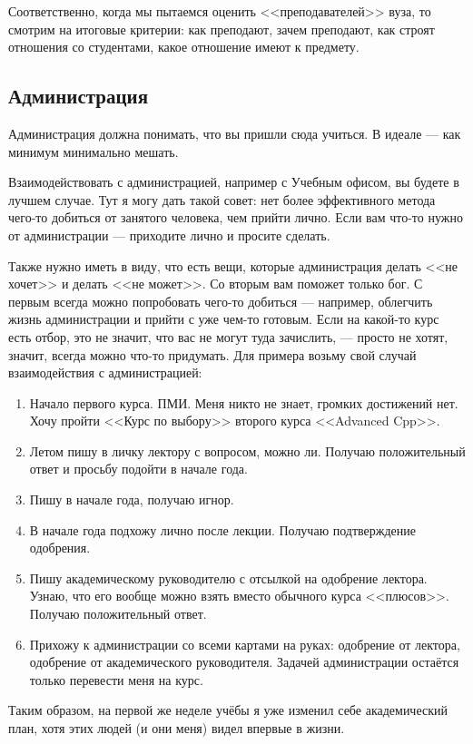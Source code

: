 \documentclass[12pt, a4paper]{article}
\begin{document}
Соответственно, когда мы пытаемся оценить <<преподавателей>> вуза, то смотрим на итоговые критерии: как преподают, зачем преподают, как строят отношения со студентами, какое отношение имеют к предмету.

\subsection{Администрация}

Администрация должна понимать, что вы пришли сюда учиться. В идеале --- как минимум минимально мешать. 

Взаимодействовать с администрацией, например с Учебным офисом, вы будете в лучшем случае. Тут я могу дать такой совет: нет более эффективного метода чего-то добиться от занятого человека, чем прийти лично. Если вам что-то нужно от администрации --- приходите лично и просите сделать.

Также нужно иметь в виду, что есть вещи, которые администрация делать <<не хочет>> и делать <<не может>>. Со вторым вам поможет только бог. С первым всегда можно попробовать чего-то добиться --- например, облегчить жизнь администрации и прийти с уже чем-то готовым. Если на какой-то курс есть отбор, это не значит, что вас не могут туда зачислить, --- просто не хотят, значит, всегда можно что-то придумать. Для примера возьму свой случай взаимодействия с администрацией:
\begin{enumerate}
    \item Начало первого курса. ПМИ. Меня никто не знает, громких достижений нет. Хочу пройти <<Курс по выбору>> второго курса <<Advanced Cpp>>. 
    \item Летом пишу в личку лектору с вопросом, можно ли. Получаю положительный ответ и просьбу подойти в начале года.
    \item Пишу в начале года, получаю игнор.
    \item В начале года подхожу лично после лекции. Получаю подтверждение одобрения.
    \item Пишу академическому руководителю с отсылкой на одобрение лектора. Узнаю, что его вообще можно взять вместо обычного курса <<плюсов>>. Получаю положительный ответ.
    \item Прихожу к администрации со всеми картами на руках: одобрение от лектора, одобрение от академического руководителя. Задачей администрации остаётся только перевести меня на курс. 
\end{enumerate}
Таким образом, на первой же неделе учёбы я уже изменил себе академический план, хотя этих людей (и они меня) видел впервые в жизни. 
\end{document}
